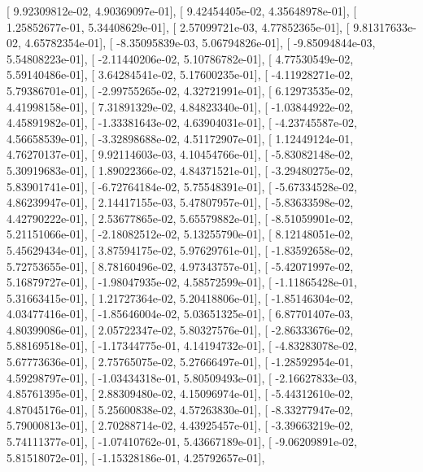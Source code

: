 \documentclass{article}
\begin{document}
       [  9.92309812e-02,   4.90369097e-01],
       [  9.42454405e-02,   4.35648978e-01],
       [  1.25852677e-01,   5.34408629e-01],
       [  2.57099721e-03,   4.77852365e-01],
       [  9.81317633e-02,   4.65782354e-01],
       [ -8.35095839e-03,   5.06794826e-01],
       [ -9.85094844e-03,   5.54808223e-01],
       [ -2.11440206e-02,   5.10786782e-01],
       [  4.77530549e-02,   5.59140486e-01],
       [  3.64284541e-02,   5.17600235e-01],
       [ -4.11928271e-02,   5.79386701e-01],
       [ -2.99755265e-02,   4.32721991e-01],
       [  6.12973535e-02,   4.41998158e-01],
       [  7.31891329e-02,   4.84823340e-01],
       [ -1.03844922e-02,   4.45891982e-01],
       [ -1.33381643e-02,   4.63904031e-01],
       [ -4.23745587e-02,   4.56658539e-01],
       [ -3.32898688e-02,   4.51172907e-01],
       [  1.12449124e-01,   4.76270137e-01],
       [  9.92114603e-03,   4.10454766e-01],
       [ -5.83082148e-02,   5.30919683e-01],
       [  1.89022366e-02,   4.84371521e-01],
       [ -3.29480275e-02,   5.83901741e-01],
       [ -6.72764184e-02,   5.75548391e-01],
       [ -5.67334528e-02,   4.86239947e-01],
       [  2.14417155e-03,   5.47807957e-01],
       [ -5.83633598e-02,   4.42790222e-01],
       [  2.53677865e-02,   5.65579882e-01],
       [ -8.51059901e-02,   5.21151066e-01],
       [ -2.18082512e-02,   5.13255790e-01],
       [  8.12148051e-02,   5.45629434e-01],
       [  3.87594175e-02,   5.97629761e-01],
       [ -1.83592658e-02,   5.72753655e-01],
       [  8.78160496e-02,   4.97343757e-01],
       [ -5.42071997e-02,   5.16879727e-01],
       [ -1.98047935e-02,   4.58572599e-01],
       [ -1.11865428e-01,   5.31663415e-01],
       [  1.21727364e-02,   5.20418806e-01],
       [ -1.85146304e-02,   4.03477416e-01],
       [ -1.85646004e-02,   5.03651325e-01],
       [  6.87701407e-03,   4.80399086e-01],
       [  2.05722347e-02,   5.80327576e-01],
       [ -2.86333676e-02,   5.88169518e-01],
       [ -1.17344775e-01,   4.14194732e-01],
       [ -4.83283078e-02,   5.67773636e-01],
       [  2.75765075e-02,   5.27666497e-01],
       [ -1.28592954e-01,   4.59298797e-01],
       [ -1.03434318e-01,   5.80509493e-01],
       [ -2.16627833e-03,   4.85761395e-01],
       [  2.88309480e-02,   4.15096974e-01],
       [ -5.44312610e-02,   4.87045176e-01],
       [  5.25600838e-02,   4.57263830e-01],
       [ -8.33277947e-02,   5.79000813e-01],
       [  2.70288714e-02,   4.43925457e-01],
       [ -3.39663219e-02,   5.74111377e-01],
       [ -1.07410762e-01,   5.43667189e-01],
       [ -9.06209891e-02,   5.81518072e-01],
       [ -1.15328186e-01,   4.25792657e-01],
\end{document}
